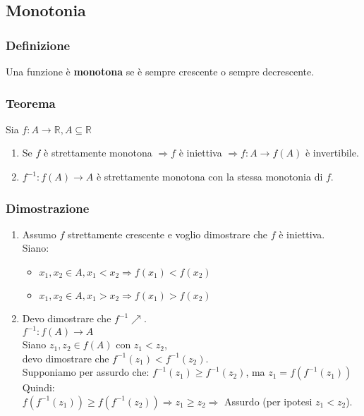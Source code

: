\subsection*{Monotonia}
    \subsubsection*{Definizione}
        Una funzione è \textbf{monotona} se è sempre crescente o sempre decrescente.
    \subsubsection*{Teorema}
        Sia $f:A \rightarrow \mathbb{R}, A \subseteq \mathbb{R}$
        \begin{enumerate}
            \item Se $f$ è strettamente monotona $\Rightarrow f$ è iniettiva $\Rightarrow f:A \rightarrow f(A)$ è invertibile.
            \item $f^{-1}:f(A) \rightarrow A$ è strettamente monotona con la stessa monotonia di $f$.
        \end{enumerate}
    \subsubsection*{Dimostrazione}
        \begin{enumerate}
            \item Assumo $f$ strettamente crescente e voglio dimostrare che $f$ è iniettiva. \\ Siano:
                \begin{itemize}
                    \item $x_{1},x_{2} \in A, x_1 < x_{2} \Rightarrow f(x_{1}) < f(x_{2}) $
                    \item $x_{1}, x_{2} \in A, x_1 > x_{2} \Rightarrow f(x_{1}) > f(x_{2}) $
                \end{itemize}
            \item Devo dimostrare che $f^{-1} \nearrow$.\\
                $f^{-1}:f(A) \rightarrow A$\\
                Siano $z_{1}, z_{2} \in f(A)$ con $z_{1} < z_{2}$,\\ devo dimostrare che $f^{-1}(z_{1}) < f^{-1}(z_{2})$. \\
                Supponiamo per assurdo che: $f^{-1}(z_{1}) \geq f^{-1}(z_{2})$, ma $z_{1} = f(f^{-1}(z_{1}))$\\
                Quindi:\\
                $f(f^{-1}(z_{1})) \geq f(f^{-1}(z_{2})) \Rightarrow z_{1} \geq z_{2} \Rightarrow$ Assurdo (per ipotesi $z_{1} < z_{2}$).
        \end{enumerate}
